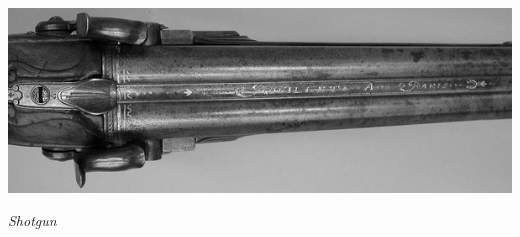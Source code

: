 \begin{multicols}{2}

\end{multicols}

\vfill

\begin{center}
\includegraphics[width=0.8\linewidth]{immagini/Double-barreled_Shotgun.png}

\emph{Shotgun}
\end{center}

\pagebreak

